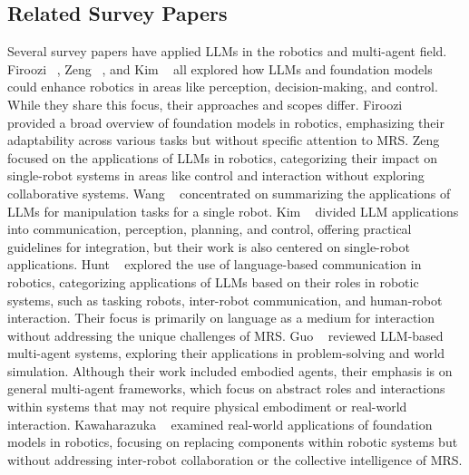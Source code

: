 \subsection{Related Survey Papers}
Several survey papers have applied LLMs in the robotics and multi-agent field.
Firoozi \etal~\cite{firoozi_foundation_2023}, Zeng \etal~\cite{zeng_large_2023}, and Kim \etal~\cite{kim_survey_2024} all explored how LLMs and foundation models could enhance robotics in areas like perception, decision-making, and control. While they share this focus, their approaches and scopes differ. Firoozi \etal~\cite{firoozi_foundation_2023} provided a broad overview of foundation models in robotics, emphasizing their adaptability across various tasks but without specific attention to MRS. Zeng \etal~\cite{zeng_large_2023} focused on the applications of LLMs in robotics, categorizing their impact on single-robot systems in areas like control and interaction without exploring collaborative systems. Wang \etal~\cite{wang2024large_survey} concentrated on summarizing the applications of LLMs for manipulation tasks for a single robot. Kim \etal~\cite{kim_survey_2024} divided LLM applications into communication, perception, planning, and control, offering practical guidelines for integration, but their work is also centered on single-robot applications. Hunt \etal~\cite{hunt_survey_2024} explored the use of language-based communication in robotics, categorizing applications of LLMs based on their roles in robotic systems, such as tasking robots, inter-robot communication, and human-robot interaction. Their focus is primarily on language as a medium for interaction without addressing the unique challenges of MRS. Guo \etal~\cite{guo_large_2024} reviewed LLM-based multi-agent systems, exploring their applications in problem-solving and world simulation. Although their work included embodied agents, their emphasis is on general multi-agent frameworks, which focus on abstract roles and interactions within systems that may not require physical embodiment or real-world interaction. Kawaharazuka \etal~\cite{kawaharazuka_real-world_2024} examined real-world applications of foundation models in robotics, focusing on replacing components within robotic systems but without addressing inter-robot collaboration or the collective intelligence of MRS.

